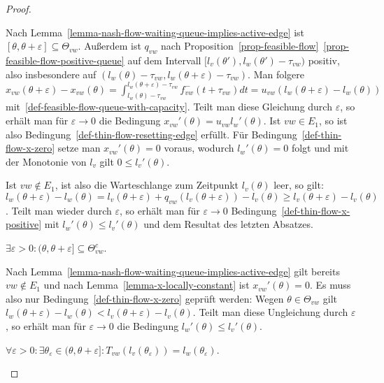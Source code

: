 \begin{proof}
\begin{description}[leftmargin=0cm, topsep=0cm, itemindent=0.5cm]
		Nach Lemma~\ref{lemma-nash-flow-waiting-queue-implies-active-edge} ist $[\theta,\theta+\varepsilon]\subseteq \Theta_{vw}$.
		Außerdem ist $q_{vw}$ nach Proposition~\ref{prop-feasible-flow}~\ref{prop-feasible-flow-positive-queue} auf dem Intervall $[ l_v(\theta') , l_w(\theta') - \tau_{vw} )$ positiv, also insbesondere auf $( l_w(\theta)-\tau_{vw} , l_w(\theta + \varepsilon) - \tau_{vw} )$.
		Man folgere $x_{vw}(\theta + \varepsilon) - x_{vw}(\theta) = \int_{l_w(\theta)-\tau_{vw}}^{l_w(\theta + \varepsilon)-\tau_{vw}} f_{vw}^-(t+\tau_{vw}) dt
		= u_{vw} (l_w(\theta + \varepsilon) - l_w(\theta))$ mit~\ref{def-feasible-flow-queue-with-capacity}.
		Teilt man diese Gleichung durch $\varepsilon$, so erhält man für $\varepsilon\rightarrow 0$ die Bedingung $x_{vw}'(\theta) = u_{vw} l_w'(\theta)$.
		Ist $vw\in E_1$, so ist also Bedingung~\ref{def-thin-flow-resetting-edge} erfüllt.
		Für Bedingung~\ref{def-thin-flow-x-zero} setze man $x_{vw}'(\theta)=0$ voraus, wodurch $l_w'(\theta)=0$ folgt und mit der Monotonie von $l_v$ gilt $0 \leq l_v'(\theta)$.
		
		Ist $vw\notin E_1$, ist also die Warteschlange zum Zeitpunkt $l_v(\theta)$ leer, so gilt: $l_w(\theta+\varepsilon) - l_w(\theta) = l_v(\theta + \varepsilon) + q_{vw}(l_v(\theta + \varepsilon)) - l_v(\theta) \geq l_v(\theta + \varepsilon) - l_v(\theta)$.
		Teilt man wieder durch $\varepsilon$, so erhält man für $\varepsilon  \rightarrow 0$ Bedingung~\ref{def-thin-flow-x-positive} mit $l_w'(\theta) \leq l_v'(\theta)$ und dem Resultat des letzten Absatzes.
		
		\item[2. Fall:] $\exists \varepsilon > 0: (\theta, \theta + \varepsilon] \subseteq \Theta_{vw}^c$.
		
		Nach Lemma~\ref{lemma-nash-flow-waiting-queue-implies-active-edge} gilt bereits $vw\notin E_1$ und nach Lemma~\ref{lemma-x-locally-constant} ist $x_{vw}'(\theta) = 0$. 
		Es muss also nur Bedingung~\ref{def-thin-flow-x-zero} geprüft werden:
		Wegen $\theta\in\Theta_{vw}$ gilt $l_w(\theta + \varepsilon) - l_w(\theta) < l_v(\theta + \varepsilon) - l_v(\theta)$.
		Teilt man diese Ungleichung  durch $\varepsilon$, so erhält man für $\varepsilon\rightarrow 0$ die Bedingung $l_w'(\theta)\leq l_v'(\theta)$.
		
		\item[3. Fall:] $\forall \varepsilon>0: \exists \theta_{\varepsilon}\in (\theta, \theta+\varepsilon]: T_{vw}(l_v(\theta_\varepsilon)) = l_w(\theta_\varepsilon)$.
		

\end{description}
\end{proof}
